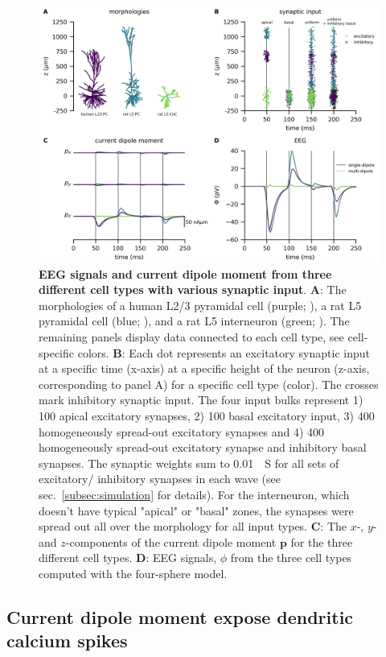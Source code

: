 \documentclass[preprint,10pt,authoryear]{elsarticle}
\begin{document}
\begin{figure}[H]
	\centering
	\includegraphics[width=1.\textwidth]{figure3.png}
	\caption{\textbf{EEG signals and current dipole moment from three different cell types with various synaptic input}.
		\textbf{A}: The morphologies of a human L2/3 pyramidal cell (purple; \cite{EYAL2016}), a rat L5 pyramidal cell (blue; \cite{HAY2011}), and a rat L5 interneuron (green; \cite{MARKRAM2015}). The remaining panels display data connected to each cell type, see cell-specific colors.
		\textbf{B}: Each dot represents an excitatory synaptic input at a specific time (x-axis) at a specific height of the neuron (z-axis, corresponding to panel A) for a specific cell type (color). The crosses mark inhibitory synaptic input. The four input bulks represent 1) 100 apical excitatory synapses, 2) 100 basal excitatory input, 3) 400 homogeneously spread-out excitatory synapses and 4) 400 homogeneously spread-out excitatory synapse and inhibitory basal synapses. The synaptic weights sum to 0.01~\si{\mu S} for all sets of excitatory/ inhibitory synapses in each wave (see sec.~\ref{subsec:simulation} for details). For the interneuron, which doesn't have typical "apical" or "basal" zones, the synapses were spread out all over the morphology for all input types.
		\textbf{C}: The $x$-, $y$- and $z$-components of the current dipole moment $\mathbf{p}$ for the three different cell types.
		\textbf{D}: EEG signals, $\phi$ from the three cell types computed with the four-sphere model.
	}
	\label{fig:eeg_compare_cell_types}
\end{figure}


\subsection{Current dipole moment expose dendritic calcium spikes}
\end{document}
